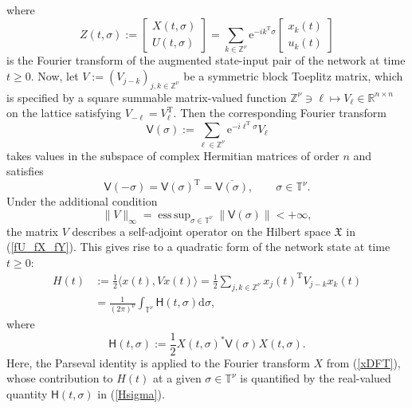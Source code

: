 \documentclass[letterpaper, 10pt, conference]{ieeeconf}  %
\def\>{\geqslant}           %
\def\mZ{\mathbb{Z}}    %
\def\mR{\mathbb{R}}    %
\def\rT{\mathrm{T}}        %
\def\bra{{\langle}}
\def\ket{{\rangle}}
\def\re{\mathrm{e}}        %
\def\rd{\mathrm{d}}        %
\def\x{\times}
\def\sH{\mathsf{H}}
\def\sV{\mathsf{V}}
\def\fX{\mathfrak{X}}
\def\mT{\mathbb{T}}
\def\mZ{\mathbb{Z}}
\def\esssup{\mathop{\mathrm{ess\, sup}}}    %
\begin{document}
where
\begin{equation}
\label{Z}
    Z(t,\sigma)
    :=
      \begin{bmatrix}
        X(t,\sigma)\\
        U(t,\sigma)
    \end{bmatrix}
    =
    \sum_{k \in \mZ^\nu}
    \re^{-ik^{\rT}\sigma}
      \begin{bmatrix}
        x_k(t)\\
        u_k(t)
    \end{bmatrix}
\end{equation}
is the Fourier transform of the augmented state-input pair of the network at time $t\>0$.
Now, let $V:= (V_{j-k})_{j,k\in \mZ^\nu}$ be a symmetric block Toeplitz matrix, which is specified by a square summable matrix-valued function $\mZ^\nu \ni \ell\mapsto V_\ell \in \mR^{n\x n}$  on the lattice  satisfying $
    V_{-\ell} = V_\ell^{\rT}
$. Then the corresponding Fourier transform
\begin{equation}
\label{cV}
    \sV(\sigma)
    :=
    \sum_{\ell\in \mZ^\nu}
    \re^{-i\ell^{\rT}\sigma}
    V_\ell
\end{equation}
takes values in the subspace of complex Hermitian matrices of order $n$ and satisfies
\begin{equation}
\label{Vsymm}
  \sV(-\sigma)
  =
  \sV(\sigma)^{\rT}
  =
  \overline{\sV(\sigma)},
  \qquad
  \sigma \in \mT^\nu.
\end{equation}
Under the additional condition
\begin{equation}
\label{Vnorm}
    \|V\|_{\infty}
    =
    \esssup_{\sigma \in \mT^\nu}
    \|\sV(\sigma)\|
    <+\infty,
\end{equation}
the matrix $V$ describes a self-adjoint operator on the Hilbert space $\fX$ in (\ref{fU_fX_fY}). This gives rise to a quadratic form of the network state at time $t\>0$:
\begin{align}
\nonumber
    H(t)
    & :=
    \frac{1}{2}
    \bra
        x(t),
        Vx(t)
    \ket
    =
    \frac{1}{2}
    \sum_{j,k\in \mZ^\nu}
    x_j(t)^{\rT}
    V_{j-k}
    x_k(t)\\
\label{H}
    & = \frac{1}{(2\pi)^\nu}
    \int_{\mT^\nu}
    \sH(t,\sigma)
    \rd \sigma,
\end{align}
where
\begin{equation}
\label{Hsigma}
    \sH(t,\sigma)
    :=
    \frac{1}{2}
      X(t,\sigma)^*
    \sV(\sigma)
    X(t,\sigma).
\end{equation}
Here, the Parseval identity is applied to the Fourier transform $X$ from  (\ref{xDFT}), whose contribution to $H(t)$ at a given $\sigma \in \mT^\nu$ is quantified by the real-valued quantity $\sH(t,\sigma)$ in (\ref{Hsigma}).
\end{document}
